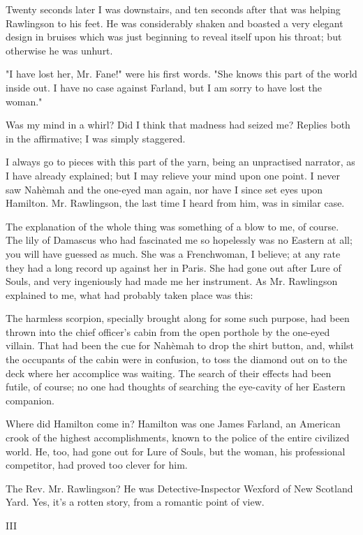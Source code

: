 Twenty seconds later I was downstairs, and ten seconds after that was
helping Rawlingson to his feet. He was considerably shaken and boasted
a very elegant design in bruises which was just beginning to reveal
itself upon his throat; but otherwise he was unhurt.

"I have lost her, Mr. Fane!" were his first words. "She knows this
part of the world inside out. I have no case against Farland, but I
am sorry to have lost the woman."

Was my mind in a whirl? Did I think that madness had seized me?
Replies both in the affirmative; I was simply staggered.

I always go to pieces with this part of the yarn, being an unpractised
narrator, as I have already explained; but I may relieve your mind
upon one point. I never saw Nahèmah and the one-eyed man again, nor
have I since set eyes upon Hamilton. Mr. Rawlingson, the last time I
heard from him, was in similar case.

The explanation of the whole thing was something of a blow to me, of
course. The lily of Damascus who had fascinated me so hopelessly was
no Eastern at all; you will have guessed as much. She was a
Frenchwoman, I believe; at any rate they had a long record up against
her in Paris. She had gone out after Lure of Souls, and very
ingeniously had made me her instrument. As Mr. Rawlingson explained
to me, what had probably taken place was this:

The harmless scorpion, specially brought along for some such purpose,
had been thrown into the chief officer's cabin from the open porthole
by the one-eyed villain. That had been the cue for Nahèmah to drop the
shirt button, and, whilst the occupants of the cabin were in
confusion, to toss the diamond out on to the deck where her accomplice
was waiting. The search of their effects had been futile, of course;
no one had thoughts of searching the eye-cavity of her Eastern
companion.

Where did Hamilton come in? Hamilton was one James Farland, an
American crook of the highest accomplishments, known to the police of
the entire civilized world. He, too, had gone out for Lure of Souls,
but the woman, his professional competitor, had proved too clever for
him.

The Rev. Mr. Rawlingson? He was Detective-Inspector Wexford of New
Scotland Yard. Yes, it's a rotten story, from a romantic point of
view.




III

